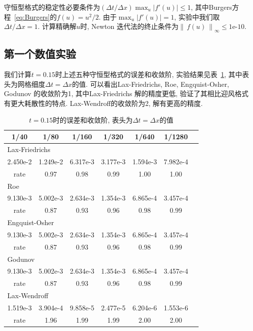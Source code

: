 \documentclass[a4paper, 12pt]{amsart}
\newcommand{\abs}[1]{\left\lvert#1\right\rvert}
\newcommand{\nm}[2]{\left\|\,#1\,\right\|_{#2}}
\numberwithin{equation}{section}
\begin{document}
守恒型格式的稳定性必要条件为$(\Delta t/\Delta x)\max_u\abs{f'(u)}\le 1$, 其中Burgers方程~\eqref{eq:Burgers}的$f(u)=u^2/2$. 由于$\max_u\abs{f'(u)}=1$, 实验中我们取$\Delta t/\Delta x=1$. 计算精确解$u$时, Newton 迭代法的终止条件为$\nm{f(u)}{\infty}\le\text{1e-10}$.

\hspace*{\fill}\par\subsection{第一个数值实验}\hspace*{\fill}\par\hspace*{\fill}\par
我们计算$t=0.15$时上述五种守恒型格式的误差和收敛阶, 实验结果见表~\ref{tab:task1}, 其中表头为网格细度$\Delta t=\Delta x$的值. 可以看出Lax-Friedrichs, Roe, Engquist-Osher, Godunov 的收敛阶为1, 其中Lax-Friedrichs 解的精度更低, 验证了其相比迎风格式有更大耗散性的特点. Lax-Wendroff的收敛阶为2, 解有更高的精度.

\begin{table}[htbp]\centering\caption{$t=0.15$时的误差和收敛阶, 表头为$\Delta t=\Delta x$的值}\label{tab:task1}
\begin{tabular}{ccccccc}
\hline\hline
1/40 & 1/80 & 1/160 & 1/320 & 1/640 & 1/1280\\
\hline\hline
\multicolumn{6}{l}{Lax-Friedrichs}\\
2.450e-2 & 1.249e-2 & 6.317e-3 & 3.177e-3 & 1.594e-3 & 7.982e-4\\
rate & 0.97 & 0.98 & 0.99 & 1.00 & 1.00\\ 
\hline
\multicolumn{6}{l}{Roe}\\
9.130e-3 & 5.002e-3 & 2.634e-3 & 1.354e-3 & 6.865e-4 & 3.457e-4\\
rate & 0.87 & 0.93 & 0.96 & 0.98 & 0.99\\
\hline
\multicolumn{6}{l}{Engquist-Osher}\\
9.130e-3 & 5.002e-3 & 2.634e-3 & 1.354e-3 & 6.865e-4 & 3.457e-4\\
rate & 0.87 & 0.93 & 0.96 & 0.98 & 0.99\\
\hline
\multicolumn{6}{l}{Godunov}\\
9.130e-3 & 5.002e-3 & 2.634e-3 & 1.354e-3 & 6.865e-4 & 3.457e-4\\
rate & 0.87 & 0.93 & 0.96 & 0.98 & 0.99\\
\hline
\multicolumn{6}{l}{Lax-Wendroff}\\
1.519e-3 & 3.904e-4 & 9.858e-5 & 2.477e-5 & 6.204e-6 & 1.553e-6\\
rate & 1.96 & 1.99 & 1.99 & 2.00 & 2.00\\
\hline\hline
\end{tabular}\end{table}
\end{document}
